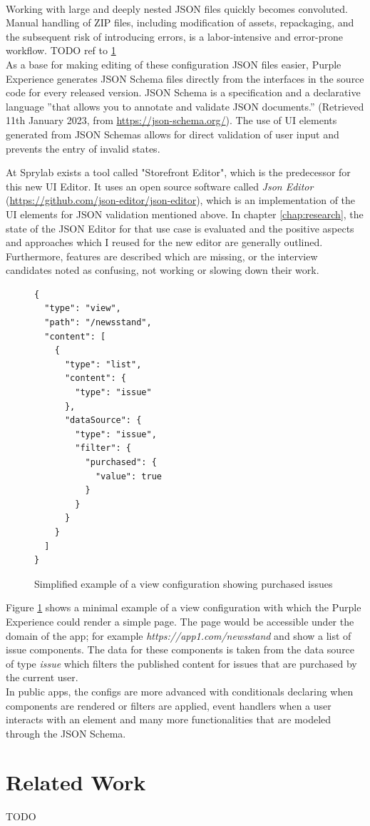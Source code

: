 \\
Working with large and deeply nested JSON files quickly becomes convoluted.
Manual handling of ZIP files, including modification of assets, repackaging, and the subsequent risk of introducing errors, is a labor-intensive and error-prone workflow.
TODO ref to \ref{fig:viewexample}
\\
As a base for making editing of these configuration JSON files easier, Purple Experience generates JSON Schema files directly from the interfaces in the source code for every released version.
JSON Schema is a specification and a declarative language ''that allows you to annotate and validate JSON documents.'' (Retrieved 11th January 2023, from \url{https://json-schema.org/}).
The use of UI elements generated from JSON Schemas allows for direct validation of user input and prevents the entry of invalid states.

At Sprylab exists a tool called "Storefront Editor", which is the predecessor for this new UI Editor.
It uses an open source software called \textit{Json Editor} (\url{https://github.com/json-editor/json-editor}), which is an implementation of the UI elements for JSON validation mentioned above.
In chapter \ref{chap:research}, the state of the JSON Editor for that use case is evaluated and the positive aspects and approaches which I reused for the new editor are generally outlined.
Furthermore, features are described which are missing, or the interview candidates noted as confusing, not working or slowing down their work.

\begin{figure}[h]
  \lstset{language=json,basicstyle=\footnotesize,numbers=left,showstringspaces=false,frame=single}
  \begin{lstlisting}
{
  "type": "view",
  "path": "/newsstand",
  "content": [
    {
      "type": "list",
      "content": {
        "type": "issue"
      },
      "dataSource": {
        "type": "issue",
        "filter": {
          "purchased": {
            "value": true
          }
        }
      }
    }
  ]
}
  \end{lstlisting}
  \caption{Simplified example of a view configuration showing purchased issues}
  \label{fig:viewexample}
\end{figure}

Figure \ref{fig:viewexample} shows a minimal example of a view configuration with which the Purple Experience could render a simple page.
The page would be accessible under the domain of the app; for example \textit{https://app1.com/newsstand} and show a list of issue components.
The data for these components is taken from the data source of type \textit{issue} which filters the published content for issues that are purchased by the current user. 
\\
In public apps, the configs are more advanced with conditionals declaring when components are rendered or filters are applied, event handlers when a user interacts with an element and many more functionalities that are modeled through the JSON Schema.


\section{Related Work}

TODO